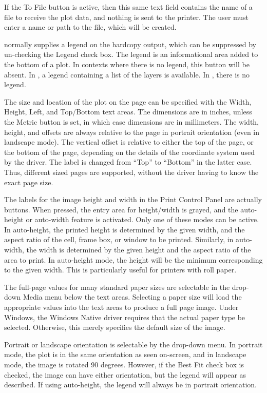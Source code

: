 If the {\cb To File} button is active, then this same text field
contains the name of a file to receive the plot data, and nothing is
sent to the printer.  The user must enter a name or path to the file,
which will be created.

{\Xic} normally supplies a legend on the hardcopy output, which can be
suppressed by un-checking the {\cb Legend} check box.  The legend is
an informational area added to the bottom of a plot.  In contexts
where there is no legend, this button will be absent.  In {\Xic}, a
legend containing a list of the layers is available.  In {\WRspice},
there is no legend.

The size and location of the plot on the page can be specified with
the {\cb Width}, {\cb Height}, {\cb Left}, and {\cb Top}/{\cb Bottom}
text areas.  The dimensions are in inches, unless the {\cb Metric}
button is set, in which case dimensions are in millimeters.  The
width, height, and offsets are always relative to the page in portrait
orientation (even in landscape mode).  The vertical offset is relative
to either the top of the page, or the bottom of the page, depending on
the details of the coordinate system used by the driver.  The label is
changed from ``{\vt Top}'' to ``{\vt Bottom}'' in the latter case. 
Thus, different sized pages are supported, without the driver having
to know the exact page size. 

The labels for the image height and width in the {\cb Print Control
Panel} are actually buttons.  When pressed, the entry area for
height/width is grayed, and the auto-height or auto-width feature is
activated.  Only one of these modes can be active.  In auto-height,
the printed height is determined by the given width, and the aspect
ratio of the cell, frame box, or window to be printed.  Similarly, in
auto-width, the width is determined by the given height and the aspect
ratio of the area to print.  In auto-height mode, the height will be
the minimum corresponding to the given width.  This is particularly
useful for printers with roll paper.

The full-page values for many standard paper sizes are selectable in
the drop-down {\cb Media} menu below the text areas.  Selecting a
paper size will load the appropriate values into the text areas to
produce a full page image.  Under Windows, the {\et Windows Native}
driver requires that the actual paper type be selected.  Otherwise,
this merely specifies the default size of the image.

Portrait or landscape orientation is selectable by the drop-down menu. 
In portrait mode, the plot is in the same orientation as seen
on-screen, and in landscape mode, the image is rotated 90 degrees. 
However, if the {\cb Best Fit} check box is checked, the image can
have either orientation, but the legend will appear as described.  If
using auto-height, the legend will always be in portrait orientation.

